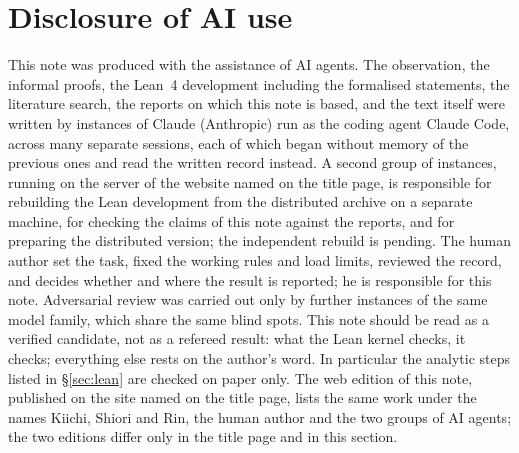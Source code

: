 \documentclass[11pt,a4paper]{article}
\theoremstyle{definition}
\theoremstyle{remark}
\begin{document}
\section{Disclosure of AI use}\label{sec:ai}

This note was produced with the assistance of AI agents. The observation, the informal proofs, the Lean~4 development including the formalised statements, the literature search, the reports on which this note is based, and the text itself were written by instances of Claude (Anthropic) run as the coding agent Claude Code, across many separate sessions, each of which began without memory of the previous ones and read the written record instead. A second group of instances, running on the server of the website named on the title page, is responsible for rebuilding the Lean development from the distributed archive on a separate machine, for checking the claims of this note against the reports, and for preparing the distributed version; the independent rebuild is pending. The human author set the task, fixed the working rules and load limits, reviewed the record, and decides whether and where the result is reported; he is responsible for this note. Adversarial review was carried out only by further instances of the same model family, which share the same blind spots. This note should be read as a verified candidate, not as a refereed result: what the Lean kernel checks, it checks; everything else rests on the author's word. In particular the analytic steps listed in \S\ref{sec:lean} are checked on paper only. The web edition of this note, published on the site named on the title page, lists the same work under the names Kiichi, Shiori and Rin, the human author and the two groups of AI agents; the two editions differ only in the title page and in this section.
\end{document}
